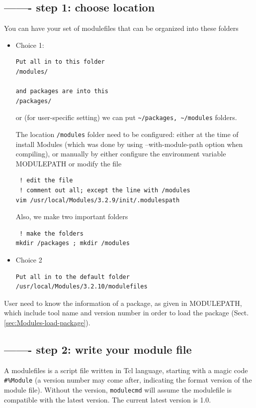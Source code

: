 \subsection{------- step 1: choose location}

You can have your set of modulefiles that can be organized into these folders
\begin{itemize}
  \item Choice 1:
  
\begin{verbatim}
Put all in to this folder
/modules/

and packages are into this
/packages/

\end{verbatim}
or (for user-specific setting) we can put \verb!~/packages, ~/modules! folders.

The location \verb!/modules! folder need to be configured: either at the time of
install Modules (which was done by using --with-module-path option when
compiling), or manually by either configure the environment variable MODULEPATH
or modify the file
\begin{verbatim}
 ! edit the file
 ! comment out all; except the line with /modules
vim /usr/local/Modules/3.2.9/init/.modulespath
\end{verbatim}

Also, we make two important folders
\begin{verbatim}
 ! make the folders
mkdir /packages ; mkdir /modules
\end{verbatim}

  \item Choice 2

\begin{verbatim}
Put all in to the default folder
/usr/local/Modules/3.2.10/modulefiles

\end{verbatim}
\end{itemize}
User need to know the information of a package, as given in MODULEPATH, which
include tool name and version number in order to load the package
(Sect.\ref{sec:Modules-load-package}).

\subsection{------- step 2: write your module file}
\label{sec:write-module-file}

A modulefiles is a script file written in Tcl language, starting with a magic
code \verb!#%Module! (a version number may come after, indicating the format
version of the module file). Without the version, 
\verb!modulecmd! will assume the modulefile is compatible with the latest
version. The current latest version is 1.0.

